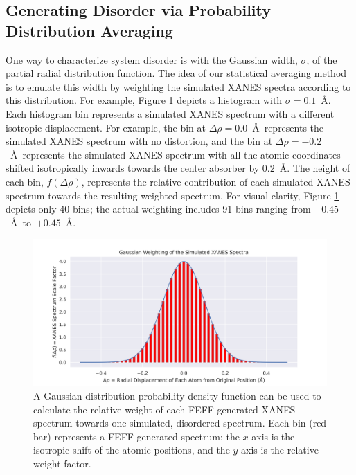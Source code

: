 \subsection{Generating Disorder via Probability Distribution Averaging}

One way to characterize system disorder is with the Gaussian width, $ \sigma $, of the partial radial distribution function. The idea of our statistical averaging method is to emulate this width by weighting the simulated XANES spectra according to this distribution. For example, Figure \ref{fig:gaussian-weighting-hist} depicts a histogram with $ \sigma=0.1 $~\AA. Each histogram bin represents a simulated XANES spectrum with a different isotropic displacement. For example, the bin at $ \Delta\rho=0.0 $~\AA~represents the simulated XANES spectrum with no distortion, and the bin at $ \Delta\rho=-0.2 $~\AA~represents the simulated XANES spectrum with all the atomic coordinates shifted isotropically inwards towards the center absorber by $ 0.2 $~\AA. The height of each bin, $ f(\Delta\rho) $, represents the relative contribution of each simulated XANES spectrum towards the resulting weighted spectrum. For visual clarity, Figure \ref{fig:gaussian-weighting-hist} depicts only 40 bins; the actual weighting includes 91 bins ranging from $ -0.45 $~\AA~to~$ +0.45 $~\AA.
\begin{figure}[h!]
	\centering
	\includegraphics[width=\linewidth]{Chapters/Figures/gaussian-weighting-hist.png}
	\caption[Simulated Spectrum Gaussian Weighting]{A Gaussian distribution probability density function can be used to calculate the relative weight of each FEFF generated XANES spectrum towards one simulated, disordered spectrum. Each bin (red bar) represents a FEFF generated spectrum; the $x$-axis is the isotropic shift of the atomic positions, and the $y$-axis is the relative weight factor.}
	\label{fig:gaussian-weighting-hist}
\end{figure}

